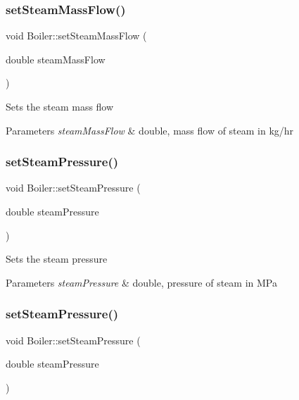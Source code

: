 \subsubsection{\texorpdfstring{set\+Steam\+Mass\+Flow()}{setSteamMassFlow()}\hspace{0.1cm}{\footnotesize\ttfamily [3/3]}}
{\footnotesize\ttfamily void Boiler\+::set\+Steam\+Mass\+Flow (\begin{DoxyParamCaption}\item[{double}]{steam\+Mass\+Flow }\end{DoxyParamCaption})}

Sets the steam mass flow 
\begin{DoxyParams}{Parameters}
{\em steam\+Mass\+Flow} & double, mass flow of steam in kg/hr \\
\hline
\end{DoxyParams}
\mbox{\label{class_boiler_a0a4619ff73c9969daebe3aa66ddad6be}} 
\subsubsection{\texorpdfstring{set\+Steam\+Pressure()}{setSteamPressure()}\hspace{0.1cm}{\footnotesize\ttfamily [1/3]}}
{\footnotesize\ttfamily void Boiler\+::set\+Steam\+Pressure (\begin{DoxyParamCaption}\item[{double}]{steam\+Pressure }\end{DoxyParamCaption})}

Sets the steam pressure 
\begin{DoxyParams}{Parameters}
{\em steam\+Pressure} & double, pressure of steam in M\+Pa \\
\hline
\end{DoxyParams}
\mbox{\label{class_boiler_a0a4619ff73c9969daebe3aa66ddad6be}} 
\subsubsection{\texorpdfstring{set\+Steam\+Pressure()}{setSteamPressure()}\hspace{0.1cm}{\footnotesize\ttfamily [2/3]}}
{\footnotesize\ttfamily void Boiler\+::set\+Steam\+Pressure (\begin{DoxyParamCaption}\item[{double}]{steam\+Pressure }\end{DoxyParamCaption})}

